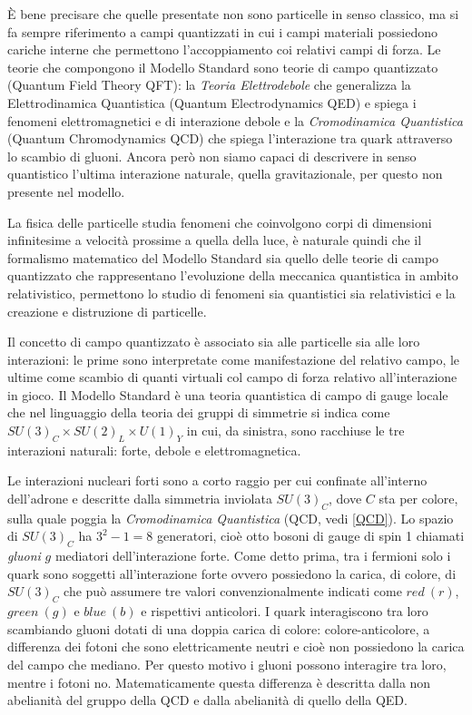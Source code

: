     È bene precisare che quelle presentate non sono particelle in senso classico, ma si fa sempre riferimento a campi quantizzati in cui i campi materiali possiedono cariche interne che permettono l'accoppiamento coi relativi campi di forza. Le teorie che compongono il Modello Standard sono teorie di campo quantizzato (Quantum Field Theory QFT): la \textit{Teoria Elettrodebole} che generalizza la Elettrodinamica Quantistica (Quantum Electrodynamics QED) e spiega i fenomeni elettromagnetici e di interazione debole e la \textit{Cromodinamica Quantistica} (Quantum Chromodynamics QCD) che spiega l'interazione tra quark attraverso lo scambio di gluoni. Ancora però non siamo capaci di descrivere in senso quantistico l'ultima interazione naturale, quella gravitazionale, per questo non presente nel modello.

    La fisica delle particelle studia fenomeni che coinvolgono corpi di dimensioni infinitesime a velocità prossime a quella della luce, è naturale quindi che il formalismo matematico del Modello Standard sia quello delle teorie di campo quantizzato che rappresentano l'evoluzione della meccanica quantistica in ambito relativistico, permettono lo studio di fenomeni sia quantistici sia relativistici e la creazione e distruzione di particelle.
    
    Il concetto di campo quantizzato è associato sia alle particelle sia alle loro interazioni: le prime sono interpretate come manifestazione del relativo campo, le ultime come scambio di quanti virtuali col campo di forza relativo all'interazione in gioco. Il Modello Standard è una teoria quantistica di campo di gauge locale che nel linguaggio della teoria dei gruppi di simmetrie si indica come $SU(3)_C \times SU(2)_L \times U(1)_Y$ in cui, da sinistra, sono racchiuse le tre interazioni naturali: forte, debole e elettromagnetica.

    Le interazioni nucleari forti sono a corto raggio per cui confinate all'interno dell'adrone e descritte dalla simmetria inviolata $SU(3)_C$, dove $C$ sta per colore, sulla quale poggia la \textit{Cromodinamica Quantistica} (QCD, vedi \ref{QCD}). Lo spazio di $SU(3)_C$ ha $3^2 - 1 = 8$ generatori, cioè otto bosoni di gauge di spin 1 chiamati \textit{gluoni} $g$ mediatori dell'interazione forte. Come detto prima, tra i fermioni solo i quark sono soggetti all'interazione forte ovvero possiedono la carica, di colore, di $SU(3)_C$ che può assumere tre valori convenzionalmente indicati come $red\ (r)$, $green\ (g)$ e $blue\ (b)$ e rispettivi anticolori. I quark interagiscono tra loro scambiando gluoni dotati di una doppia carica di colore: colore-anticolore, a differenza dei fotoni che sono elettricamente neutri e cioè non possiedono la carica del campo che mediano. Per questo motivo i gluoni possono interagire tra loro, mentre i fotoni no. Matematicamente questa differenza è descritta dalla non abelianità del gruppo della QCD e dalla abelianità di quello della QED.

